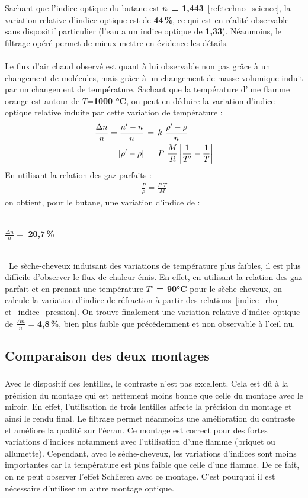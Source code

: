 Sachant que l’indice optique du butane est \textbf{$\mathnormal{n}$ = 1,443}~\ref{ref:techno_science}, la variation relative d’indice optique est de \textbf{44\,\%}, ce qui est en réalité observable sans dispositif particulier (l’eau a un indice optique de \textbf{1,33}). Néanmoins, le filtrage opéré permet de mieux mettre en évidence les détails.\\ \\
Le flux d’air chaud observé est quant à lui observable non pas grâce à un changement de molécules, mais grâce à un changement de masse volumique induit par un changement de température. Sachant que la température d'une flamme orange est autour de $T$=\textbf{1000 °C}, on peut en déduire la variation d'indice optique relative induite par cette variation de température :
\begin{align}
	\frac{\Delta n}{n}=\frac{n'-n}{n} \,&= \, k \,\,\frac{\rho' - \rho}{n}
	\label{indice_rho}\\
	|\rho' - \rho| \,&= \, P \,\,\frac{M}{R}\,\bigg{|}\frac{1}{T'}-\frac{1}{T}\bigg{|}
	\label{indice_pression}
\end{align}
En utilisant la relation des gaz parfaits :
\begin{align}
\frac{P}{\rho} = \frac{R\, T}{M}
\label{gaz_parfait}
\end{align}
on obtient, pour le butane, une variation d'indice de :\\\\
\centerline{$\frac{\Delta n}{n} = $ \textbf{20,7\,\%}} \\\
Le sèche-cheveux induisant des variations de température plus faibles, il est plus difficile d’observer le flux de chaleur émis. En effet, en utilisant la relation des gaz parfait et en prenant une température \textbf{$T’$ = 90°C} pour le sèche-cheveux, on calcule la variation d'indice de réfraction à partir des relations~\ref{indice_rho} et~\ref{indice_pression}. On trouve finalement une variation relative d’indice optique de $\frac{\Delta n}{n}$ = \textbf{4,8\,\%}, bien plus faible que précédemment et non observable à l'œil nu.
\subsection{Comparaison des deux montages}
\subsubsection{\large{}}
Avec le dispositif des lentilles, le contraste n’est pas excellent. Cela est dû à la précision du montage qui est nettement moins bonne que celle du montage avec le miroir. En effet, l’utilisation de trois lentilles affecte la précision du montage et ainsi le rendu final. Le filtrage permet néanmoins une amélioration du contraste et améliore la qualité sur l’écran. Ce montage est correct pour des fortes variations d’indices notamment avec l’utilisation d’une flamme (briquet ou allumette). Cependant, avec le sèche-cheveux, les variations d’indices sont moins importantes car la température est plus faible que celle d’une flamme. De ce fait, on ne peut observer l’effet Schlieren avec ce montage. C’est pourquoi il est nécessaire d’utiliser un autre montage optique.

